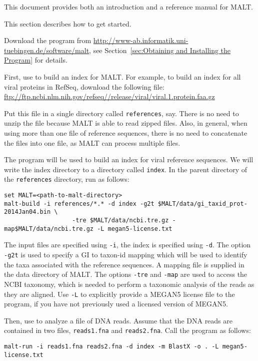 \documentclass[11pt]{article}
\newcommand\MALT{{\sf MALT}\xspace}
\begin{document}
This document provides both an introduction and a reference manual for \MALT.

\pagebreak

This section describes how to get started.

Download the program from \url{http://www-ab.informatik.uni-tuebingen.de/software/malt}, 
see Section~\ref{sec:Obtaining and Installing the Program}
for details.


First, use  to build an index for \MALT. For example,
to build an index for all viral proteins in RefSeq, download the following file:
\url{ftp://ftp.ncbi.nlm.nih.gov/refseq//release/viral/viral.1.protein.faa.gz}


Put this file in a single directory called {\tt references}, say. There is no need to unzip the file
because \MALT is able to read zipped files. Also, in general, when using more than one file of reference sequences,
there is no need to concatenate the files into one file, as \MALT can process multiple files.

The program  will be used to build an index for viral reference sequences. We will write the index
directory to a directory called {\tt index}.
In the parent directory of the {\tt references} directory, run  as follows:
{\footnotesize
\begin{verbatim}
set MALT=<path-to-malt-directory>
malt-build -i references/*.* -d index -g2t $MALT/data/gi_taxid_prot-2014Jan04.bin \
                   -tre $MALT/data/ncbi.tre.gz -map$MALT/data/ncbi.tre.gz -L megan5-license.txt
\end{verbatim}
}

The input files are specified using {\tt -i}, the index is specified using {\tt -d}. 
The option {\tt -g2t} is used to specify a GI to taxon-id mapping which will be used to identify the taxa associated with
the reference sequences. A mapping file is supplied in the data directory of \MALT.
The options {\tt -tre} and {\tt -map} are used to access the NCBI taxonomy, which is needed to perform a taxonomic analysis of the reads as they are aligned. Use {\tt -L} to explicitly provide a MEGAN5 license file to the program, if you have not previously used a licensed version of MEGAN5.

Then, use  to analyze a file of DNA reads. Assume that the DNA reads are
contained in two files, {\tt reads1.fna} and {\tt reads2.fna}. Call the program as follows:
{\footnotesize
\begin{verbatim}
malt-run -i reads1.fna reads2.fna -d index -m BlastX -o . -L megan5-license.txt
\end{verbatim}
}
\end{document}
